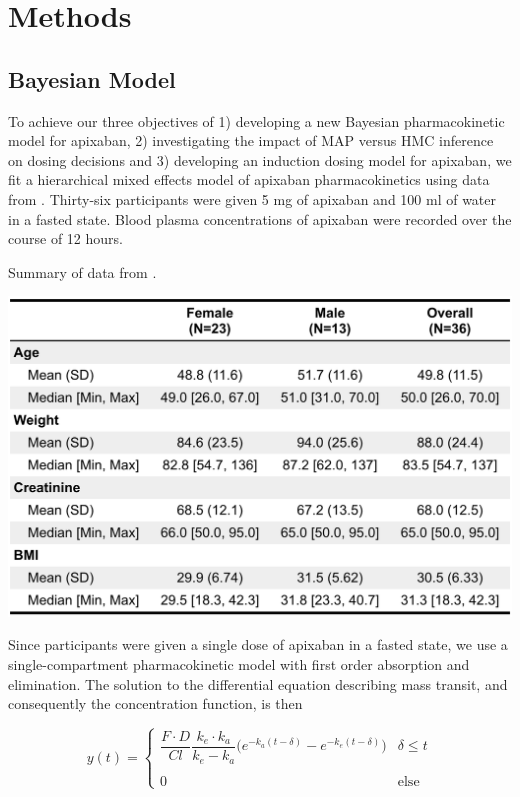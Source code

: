 \section{Methods}

\subsection*{Bayesian Model}

To achieve our three objectives of 1) developing a new Bayesian pharmacokinetic model for apixaban, 2) investigating the impact of MAP versus HMC inference on dosing decisions and 3) developing an induction dosing model for apixaban, we fit a hierarchical mixed effects model of apixaban pharmacokinetics using data from \cite{Beaton2018-el}.  Thirty-six participants were given 5 mg of apixaban and 100 ml of water in a fasted state. Blood plasma concentrations of apixaban were recorded over the course of 12 hours.



\begin{table}[htb]
	\centering
	\caption{Summary of data from  \cite{Beaton2018-el}. } 
	\label{tab:my table} 
	\includegraphics[width=0.7\linewidth]{figs/table1}
\end{table}


\noindent Since participants were given a single dose of apixaban in a fasted state, we use a single-compartment pharmacokinetic model with first order absorption and elimination.  The solution to the differential equation describing mass transit, and consequently the concentration function, is then


\begin{equation} \label{eq:eq_1}
y(t) =  \begin{cases}  \dfrac{F \cdot D}{\mathit{Cl}} \dfrac{k_e \cdot k_a}{k_e - k_a}\Bigg( e^{-k_a (t-\delta)} - e^{-k_e(t-\delta)} \Bigg)  & \delta \leq t\\\\ 0 & \mbox{else} \end{cases}
\end{equation}

